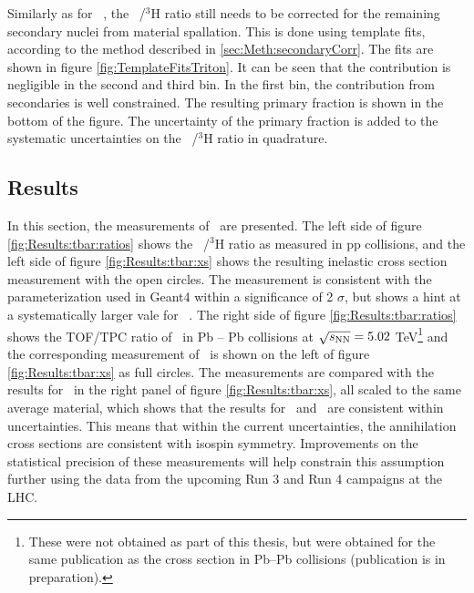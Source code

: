 Similarly as for \ahe\ , the \atrit\ /$^3\mathrm{H}$ ratio still needs to be corrected for the remaining secondary nuclei from material spallation. This is done using template fits, according to the method described in \ref{sec:Meth:secondaryCorr}. The fits are shown in figure \ref{fig:TemplateFitsTriton}. It can be seen that the contribution is negligible in the second and third bin. In the first bin, the contribution from secondaries is well constrained. The resulting primary fraction is shown in the bottom of the figure. The uncertainty of the primary fraction is added to the systematic uncertainties on the \atrit\ /$^3\mathrm{H}$ ratio in quadrature.


\subsection{Results}
In this section, the measurements of \sigmainelH\ are presented. The left side of figure \ref{fig:Results:tbar:ratios} shows the \atrit\ /$^3\mathrm{H}$ ratio as measured in pp collisions, and the left side of figure \ref{fig:Results:tbar:xs} shows the resulting inelastic cross section measurement with the open circles. The measurement is consistent with the parameterization used in Geant4 within a significance of 2 $\sigma$, but shows a hint at a systematically larger vale for \sigmainelH\ . The right side of figure \ref{fig:Results:tbar:ratios} shows the TOF/TPC ratio of \atrit\ in Pb -- Pb collisions at $\sqrt{s_{\rm{NN}}}=5.02$ TeV\footnote{These were not obtained as part of this thesis, but were obtained for the same publication as the cross section in Pb--Pb collisions (publication is in preparation).} and the corresponding measurement of \sigmainelH\ is shown on the left of figure \ref{fig:Results:tbar:xs} as full circles. The measurements are compared with the results for \ahe\ in the right panel of figure \ref{fig:Results:tbar:xs}, all scaled to the same average material, which shows that the results for \atrit\ and \ahe\ are consistent within uncertainties. This means that within the current uncertainties, the annihilation cross sections are consistent with isospin symmetry. Improvements on the statistical precision of these measurements will help constrain this assumption further using the data from the upcoming Run 3 and Run 4 campaigns at the LHC. 

